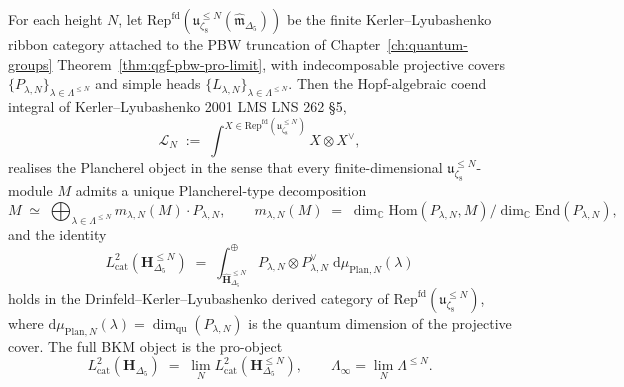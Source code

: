 \begin{theorem}
\label{thm:modtr-plancherel-kerlerlyubashenko}
For each height \(N\), let
\(\mathrm{Rep}^{\mathrm{fd}}(\mathfrak u_{\zeta_8}^{\leq N}(\widehat
{\mathfrak m}_{\Delta_5}))\) be the finite Kerler--Lyubashenko ribbon
category attached to the PBW truncation of
Chapter~\ref{ch:quantum-groups}
Theorem~\ref{thm:qgf-pbw-pro-limit}, with indecomposable projective
covers \(\{P_{\lambda,N}\}_{\lambda\in\Lambda^{\leq N}}\) and simple
heads \(\{L_{\lambda,N}\}_{\lambda\in\Lambda^{\leq N}}\). Then the
Hopf-algebraic coend integral of
Kerler--Lyubashenko 2001 LMS LNS 262 \S5,
\[
 \mathcal L_N
 \;:=\;
 \int^{X\in\mathrm{Rep}^{\mathrm{fd}}(\mathfrak u_{\zeta_8}^{\leq N})}
 X \otimes X^\vee,
\]
realises the Plancherel object in the sense that every finite-dimensional
\(\mathfrak u_{\zeta_8}^{\leq N}\)-module \(M\) admits a unique Plancherel-type
decomposition
\[
 M \;\simeq\; \bigoplus_{\lambda\in\Lambda^{\leq N}}
 m_{\lambda,N}(M)\cdot P_{\lambda,N},
 \qquad
 m_{\lambda,N}(M) \;=\; \dim_{\mathbb C}\mathrm{Hom}(P_{\lambda,N}, M)
/\dim_{\mathbb C}\mathrm{End}(P_{\lambda,N}),
\]
and the identity
\[
 \boxed{\;
 L^2_{\mathrm{cat}}(\mathbf H_{\Delta_5}^{\leq N})
 \;=\;
 \int^{\oplus}_{\widehat{\mathbf H}_{\Delta_5}^{\leq N}}
 P_{\lambda,N} \otimes P_{\lambda,N}^\vee
 \;\mathrm d\mu_{\mathrm{Plan},N}(\lambda)\;}
\]
holds in the Drinfeld--Kerler--Lyubashenko derived category of
$\mathrm{Rep}^{\mathrm{fd}}(\mathfrak u_{\zeta_8}^{\leq N})$, where
$\mathrm d\mu_{\mathrm{Plan},N}(\lambda) = \dim_{\mathrm{qu}}(P_{\lambda,N})$
is the quantum dimension of the projective cover.  The full BKM object
is the pro-object
\[
 L^2_{\mathrm{cat}}(\mathbf H_{\Delta_5})
 \;=\;\lim_N L^2_{\mathrm{cat}}(\mathbf H_{\Delta_5}^{\leq N}),
 \qquad
 \Lambda_\infty=\lim_N\Lambda^{\leq N}.
\]
\end{theorem}

